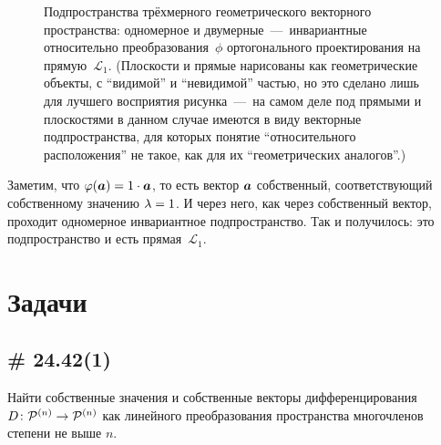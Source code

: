 \documentclass[a4paper,12pt]{article}
\begin{document}
\begin{example}
\begin{figure}[h]
      \caption{Подпространства трёхмерного геометрического векторного пространства: одномерное и двумерные~---~инвариантные относительно преобразования~$\phi$ ортогонального проектирования на прямую~$\mathcal L_1$. (Плоскости и прямые нарисованы как геометрические объекты, с ``видимой'' и ``невидимой'' частью, но это сделано лишь для лучшего восприятия рисунка~---~на самом деле под прямыми и плоскостями в данном случае имеются в виду векторные подпространства, для которых понятие ``относительного расположения'' не такое, как для их ``геометрических аналогов''.)}
      \label{fig:inv-subspaces}
    \end{figure}
    
    Заметим, что
    $
      \phi(\bds a) \hm= 1 \cdot \bds a
    $,
    то есть вектор $\boldsymbol a$ собственный, соответствующий собственному значению $\lambda \hm= 1$.
    И через него, как через собственный вектор, проходит одномерное инвариантное подпространство.
    Так и получилось: это подпространство и есть прямая~$\mathcal L_1$.
  \end{example}
  
  
  \section{Задачи}
  
  
  \subsection{\# 24.42(1)}
  
  Найти собственные значения и собственные векторы дифференцирования $D\colon \mathcal P^{(n)} \hm\to \mathcal P^{(n)}$ как линейного преобразования пространства многочленов степени не выше $n$.
  
\end{document}
